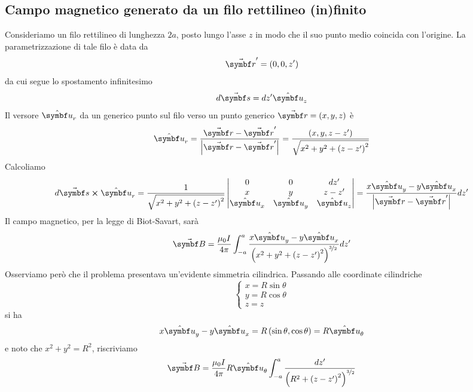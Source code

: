 \subsection{Campo magnetico generato da un filo rettilineo (in)finito}
Consideriamo un filo rettilineo di lunghezza $2a$, posto lungo l'asse $z$ in modo che il suo punto medio coincida con l'origine. La parametrizzazione di tale filo è data da
\begin{equation*}
	\vba{r}'=\left(0,0,z'\right)
\end{equation*}
da cui segue lo spostamento infinitesimo
\begin{equation*}
	d\vba{s}=dz'\vbh{u}_z
\end{equation*}
Il versore $\vbh{u}_r$ da un generico punto sul filo verso un punto generico $\vba{r}=(x,y,z)$ è
\begin{equation*}
	\vbh{u}_r=\frac{\vba{r}-\vba{r}'}{\abs{\vba{r}-\vba{r}'}}=\frac{\left(x,y,z-z'\right)}{\sqrt{x^2+y^2+\left(z-z'\right)^2}}
\end{equation*}
Calcoliamo
\begin{equation*}
	d\vba{s}\cross\vbh{u}_r=\frac{1}{\sqrt{x^2+y^2+\left(z-z'\right)^2}}
	\begin{vmatrix}
		0 & 0 & dz'\\
		x & y & z-z'\\
		\vbh{u}_x & \vbh{u}_y & \vbh{u}_z 
	\end{vmatrix}
	=\frac{x\vbh{u}_y-y\vbh{u}_x}{\abs{\vba{r}-\vba{r}'}}dz'
\end{equation*}
Il campo magnetico, per la legge di Biot-Savart, sarà
\begin{equation}
	\vba{B}=\frac{\mu_0 I}{4\pi}\int_{-a}^{a} \frac{x\vbh{u}_y-y\vbh{u}_x}{\left(x^2+y^2+\left(z-z'\right)^2\right)^{\nicefrac{3}{2}}}dz'
\end{equation}
Osserviamo però che il problema presentava un'evidente simmetria cilindrica. Passando alle coordinate cilindriche
\begin{equation*}
	\begin{cases}
		x=R\sin\theta\\
		y=R\cos\theta\\
		z=z
	\end{cases}
\end{equation*}
si ha
\begin{equation*}
	x\vbh{u}_y-y\vbh{u}_x=R\left(\sin\theta,\cos\theta\right)=R\vbh{u}_{\theta}
\end{equation*}
e noto che $x^2+y^2=R^2$, riscriviamo
\begin{equation*}
	\vba{B}=\frac{\mu_0 I}{4\pi}R\vbh{u}_{\theta}\int_{-a}^{a}\frac{dz'}{\left(R^2+\left(z-z'\right)^2\right)^{\nicefrac{3}{2}}}
\end{equation*}
